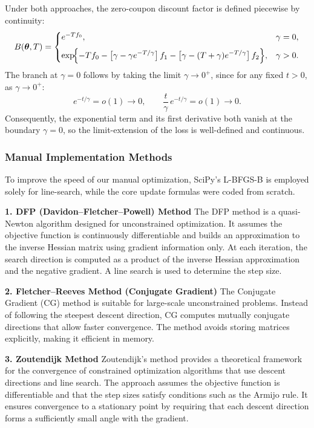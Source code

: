 \documentclass[12pt]{article}
\begin{document}
Under both approaches, the zero-coupon discount factor is defined piecewise by continuity:
\[
B(\boldsymbol{\theta},T)
=
\begin{cases}
  e^{-T f_{0}}, & \gamma = 0,\\[6pt]
  \displaystyle
  \exp\!\Bigl\{-T f_{0}
    -\bigl[\gamma-\gamma e^{-T/\gamma}\bigr]\,f_{1}
    -\bigl[\gamma-(T+\gamma)e^{-T/\gamma}\bigr]\,f_{2}
  \Bigr\}, & \gamma>0.
\end{cases}
\]
The branch at \(\gamma=0\) follows by taking the limit \(\gamma\to0^{+}\), since for any fixed $t>0$, as \(\gamma\to0^+\):
            \[
            e^{-t/\gamma}=o(1)\to0,
            \qquad
            \frac{t}{\gamma}\,e^{-t/\gamma}=o(1)\to0.
            \]Consequently, the exponential term and its first derivative both vanish at the boundary $\gamma=0$, so the limit-extension of the loss is well-defined and continuous.



\subsubsection{Manual Implementation Methods}
To improve the speed of our manual optimization, SciPy’s L-BFGS-B is employed solely for line-search, while the core update formulas were coded from scratch. \newline

\textbf{1. DFP (Davidon–Fletcher–Powell) Method}
The DFP method is a quasi-Newton algorithm designed for unconstrained optimization. It assumes the objective function is continuously differentiable and builds an approximation to the inverse Hessian matrix using gradient information only. At each iteration, the search direction is computed as a product of the inverse Hessian approximation and the negative gradient. A line search is used to determine the step size. 

\textbf{2. Fletcher–Reeves Method (Conjugate Gradient) }
The Conjugate Gradient (CG) method is suitable for large-scale unconstrained problems. Instead of following the steepest descent direction, CG computes mutually conjugate directions that allow faster convergence. The method avoids storing matrices explicitly, making it efficient in memory.

\textbf{3. Zoutendijk Method}
Zoutendijk's method provides a theoretical framework for the convergence of constrained optimization algorithms that use descent directions and line search. The approach assumes the objective function is differentiable and that the step sizes satisfy conditions such as the Armijo rule. It ensures convergence to a stationary point by requiring that each descent direction forms a sufficiently small angle with the gradient.
\end{document}
